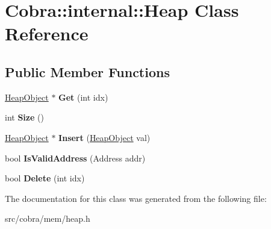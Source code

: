 \hypertarget{class_cobra_1_1internal_1_1_heap}{\section{Cobra\+:\+:internal\+:\+:Heap Class Reference}
\label{class_cobra_1_1internal_1_1_heap}
}
\subsection*{Public Member Functions}
\begin{DoxyCompactItemize}
\item 
\hypertarget{class_cobra_1_1internal_1_1_heap_aabea35e11b9ad9bb9d90b1c027424396}{\hyperlink{struct_cobra_1_1internal_1_1_heap_object}{Heap\+Object} $\ast$ {\bfseries Get} (int idx)}\label{class_cobra_1_1internal_1_1_heap_aabea35e11b9ad9bb9d90b1c027424396}

\item 
\hypertarget{class_cobra_1_1internal_1_1_heap_a42859090edacdd5de263e27711a9eca6}{int {\bfseries Size} ()}\label{class_cobra_1_1internal_1_1_heap_a42859090edacdd5de263e27711a9eca6}

\item 
\hypertarget{class_cobra_1_1internal_1_1_heap_a6110bb56a06dd1873c884c254f87d60e}{\hyperlink{struct_cobra_1_1internal_1_1_heap_object}{Heap\+Object} $\ast$ {\bfseries Insert} (\hyperlink{struct_cobra_1_1internal_1_1_heap_object}{Heap\+Object} val)}\label{class_cobra_1_1internal_1_1_heap_a6110bb56a06dd1873c884c254f87d60e}

\item 
\hypertarget{class_cobra_1_1internal_1_1_heap_a33f14048772f995fc5dbddba4e68a001}{bool {\bfseries Is\+Valid\+Address} (Address addr)}\label{class_cobra_1_1internal_1_1_heap_a33f14048772f995fc5dbddba4e68a001}

\item 
\hypertarget{class_cobra_1_1internal_1_1_heap_a0d8e49caa6e2a2c7e734fcea54e9b19d}{bool {\bfseries Delete} (int idx)}\label{class_cobra_1_1internal_1_1_heap_a0d8e49caa6e2a2c7e734fcea54e9b19d}

\end{DoxyCompactItemize}


The documentation for this class was generated from the following file\+:\begin{DoxyCompactItemize}
\item 
src/cobra/mem/heap.\+h\end{DoxyCompactItemize}
